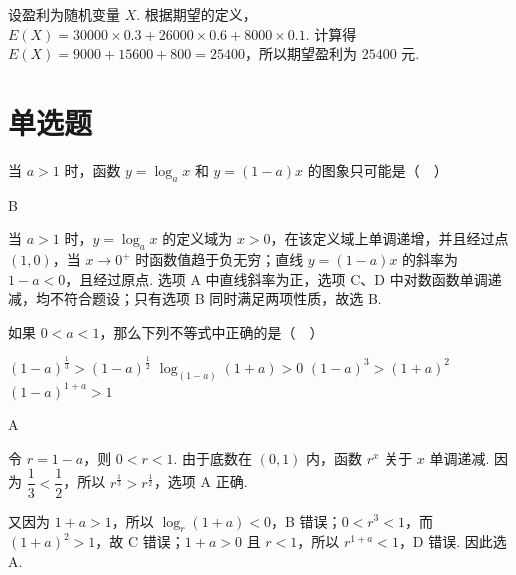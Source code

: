 \documentclass[UTF8,a4paper,oneside,11pt]{ctexbook}
\begin{document}
\begin{solution}
设盈利为随机变量 \(X\). 根据期望的定义，\(E(X)=30000\times0.3+26000\times0.6+8000\times0.1\). 计算得 \(E(X)=9000+15600+800=25400\)，所以期望盈利为 \(25400\) 元.
\end{solution}

\section{单选题}

\begin{problem}
当 \(a > 1\) 时，函数 \(y = \log_a x\) 和 \(y = (1 - a)x\) 的图象只可能是（\(\quad\)）

\choices
    {}
    {}
    {}
    {}
\end{problem}

\begin{answer}
B
\end{answer}

\begin{solution}
当 \(a>1\) 时，\(y=\log_a x\) 的定义域为 \(x>0\)，在该定义域上单调递增，并且经过点 \((1,0)\)，当 \(x\to0^+\) 时函数值趋于负无穷；直线 \(y=(1-a)x\) 的斜率为 \(1-a<0\)，且经过原点. 选项 A 中直线斜率为正，选项 C、D 中对数函数单调递减，均不符合题设；只有选项 B 同时满足两项性质，故选 B.
\end{solution}

\begin{problem}
如果 \(0 < a < 1\)，那么下列不等式中正确的是（\(\quad\)）

\choices
    {\((1 - a)^{\frac{1}{3}} > (1 - a)^{\frac{1}{2}}\)}
    {\(\log_{(1 - a)}(1 + a) > 0\)}
    {\((1 - a)^{3} > (1 + a)^{2}\)}
    {\((1 - a)^{1 + a} > 1\)}
\end{problem}

\begin{answer}
A
\end{answer}

\begin{solution}
令 \(r=1-a\)，则 \(0<r<1\). 由于底数在 \((0,1)\) 内，函数 \(r^x\) 关于 \(x\) 单调递减. 因为 \(\dfrac13<\dfrac12\)，所以 \(r^{\frac{1}{3}}>r^{\frac{1}{2}}\)，选项 A 正确.

又因为 \(1+a>1\)，所以 \(\log_r(1+a)<0\)，B 错误；\(0<r^3<1\)，而 \((1+a)^2>1\)，故 C 错误；\(1+a>0\) 且 \(r<1\)，所以 \(r^{1+a}<1\)，D 错误. 因此选 A.
\end{solution}
\end{document}
